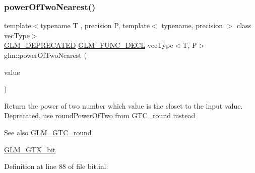 \subsubsection{\texorpdfstring{powerOfTwoNearest()}{powerOfTwoNearest()}\hspace{0.1cm}{\footnotesize\ttfamily [2/2]}}
{\footnotesize\ttfamily template$<$typename T , precision P, template$<$ typename, precision $>$ class vec\+Type$>$ \\
\mbox{\hyperlink{setup_8hpp_a8edfb48cdc249a3ee48406bf179023dc}{G\+L\+M\+\_\+\+D\+E\+P\+R\+E\+C\+A\+T\+ED}} \mbox{\hyperlink{setup_8hpp_ab2d052de21a70539923e9bcbf6e83a51}{G\+L\+M\+\_\+\+F\+U\+N\+C\+\_\+\+D\+E\+CL}} vec\+Type$<$T, P$>$ glm\+::power\+Of\+Two\+Nearest (\begin{DoxyParamCaption}\item[{vec\+Type$<$ T, P $>$ const \&}]{value }\end{DoxyParamCaption})}

Return the power of two number which value is the closet to the input value. Deprecated, use round\+Power\+Of\+Two from G\+T\+C\+\_\+round instead

\begin{DoxySeeAlso}{See also}
\mbox{\hyperlink{group__gtc__round}{G\+L\+M\+\_\+\+G\+T\+C\+\_\+round}} 

\mbox{\hyperlink{group__gtx__bit}{G\+L\+M\+\_\+\+G\+T\+X\+\_\+bit}} 
\end{DoxySeeAlso}


Definition at line 88 of file bit.\+inl.

